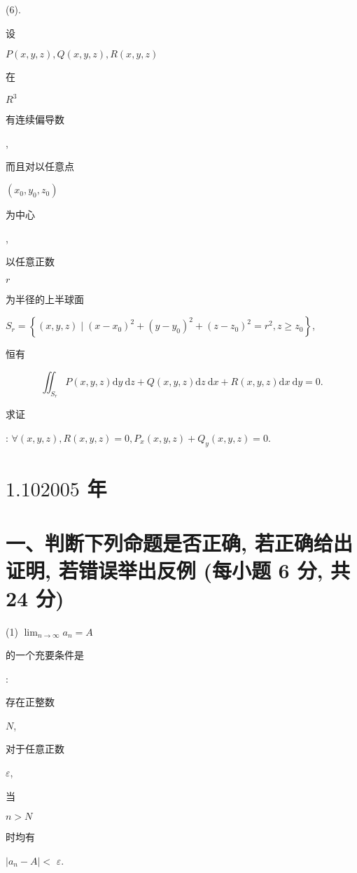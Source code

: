 \documentclass[10pt]{article}
\begin{document}
(6). \begin{CJK}{UTF8}{mj}设\end{CJK} $P(x, y, z), Q(x, y, z), R(x, y, z)$ \begin{CJK}{UTF8}{mj}在\end{CJK} $R^{3}$ \begin{CJK}{UTF8}{mj}有连续偏导数\end{CJK}, \begin{CJK}{UTF8}{mj}而且对以任意点\end{CJK} $\left(x_{0}, y_{0}, z_{0}\right)$ \begin{CJK}{UTF8}{mj}为中心\end{CJK}, \begin{CJK}{UTF8}{mj}以任意正数\end{CJK} $r$ \begin{CJK}{UTF8}{mj}为半径的上半球面\end{CJK} $S_{r}=\left\{(x, y, z) \mid\left(x-x_{0}\right)^{2}+\left(y-y_{0}\right)^{2}+\left(z-z_{0}\right)^{2}=r^{2}, z \geqslant z_{0}\right\}$, \begin{CJK}{UTF8}{mj}恒有\end{CJK}
$$
\iint_{S_{r}} P(x, y, z) \mathrm{d} y \mathrm{~d} z+Q(x, y, z) \mathrm{d} z \mathrm{~d} x+R(x, y, z) \mathrm{d} x \mathrm{~d} y=0 .
$$
\begin{CJK}{UTF8}{mj}求证\end{CJK}: $\forall(x, y, z), R(x, y, z)=0, P_{x}(x, y, z)+Q_{y}(x, y, z)=0$.

\section{$1.102005$ 年}
\section{一、判断下列命题是否正确, 若正确给出证明, 若错误举出反例 (每小题 6 分, 共 24 分)}
(1) $\lim _{n \rightarrow \infty} a_{n}=A$ \begin{CJK}{UTF8}{mj}的一个充要条件是\end{CJK}: \begin{CJK}{UTF8}{mj}存在正整数\end{CJK} $N$, \begin{CJK}{UTF8}{mj}对于任意正数\end{CJK} $\varepsilon$, \begin{CJK}{UTF8}{mj}当\end{CJK} $n>N$ \begin{CJK}{UTF8}{mj}时均有\end{CJK} $\left|a_{n}-A\right|<$ $\varepsilon .$
\end{document}
